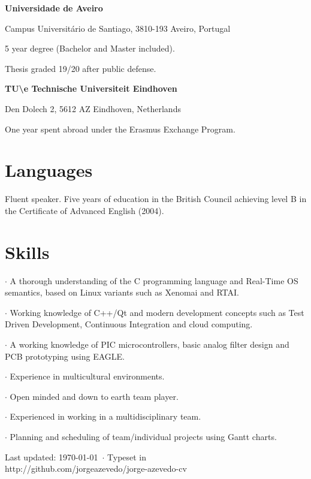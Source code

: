 {
\textbf{Universidade de Aveiro}

Campus Universitário de Santiago, 3810-193 Aveiro, Portugal
}
{
5 year degree (Bachelor and Master included).

Thesis graded 19/20 after public defense. 
}

\vspace{\baselineskip}

{
\textbf{TU\textbackslash e Technische Universiteit Eindhoven}

Den Dolech 2, 5612 AZ Eindhoven, Netherlands
}
{
One year spent abroad under the Erasmus Exchange Program.
}

\section*{Languages}

{
Fluent speaker. Five years of education in the British Council achieving level
B in the Certificate of Advanced English (2004).
}


\section*{Skills}

{
 $\cdot$ A thorough understanding of the C programming language and Real-Time OS
semantics, based on Linux variants such as Xenomai and RTAI.

 $\cdot$ Working knowledge of C++/Qt and modern development concepts such
as Test Driven Development, Continuous Integration and cloud computing.
}
{
 $\cdot$ A working knowledge of PIC microcontrollers, basic analog filter design and PCB
prototyping using EAGLE.
}
{
 $\cdot$ Experience in multicultural environments. 

 $\cdot$ Open minded and down to earth team player.

}
{

 $\cdot$ Experienced in working in a multidisciplinary team.

 $\cdot$ Planning and scheduling of team/individual projects using Gantt charts.
}


\vfill

\begin{center}
{
    \scriptsize  Last updated: \today ~$\cdot$ Typeset in \XeLaTeX\\
    http://github.com/jorgeazevedo/jorge-azevedo-cv
}

\end{center}

